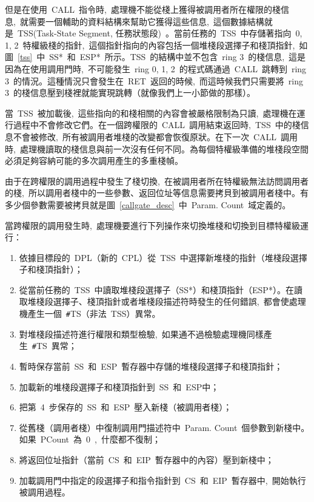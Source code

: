 
但是在使用~CALL~指令時,~處理機不能從棧上獲得被調用者所在權限的棧信息,~就需要一個輔助的資料結構來幫助它獲得這些信息,~這個數據結構就是~TSS(Task-State Segment, 任務狀態段)~。當前任務的~TSS~中存儲著指向~0, 1, 2~特權級棧的指針,~這個指針指向的內容包括一個堆棧段選擇子和棧頂指針,~如圖~\ref{tss}~中~SS*~和~ESP*~所示。TSS~的結構中並不包含~ring 3~的棧信息,~這是因為在使用調用門時,~不可能發生~ring 0, 1, 2~的程式碼通過~CALL~跳轉到~ring 3~的情況。這種情況只會發生在~RET~返回的時候,~而這時候我們只需要將~ring 3~的棧信息壓到棧裡就能實現跳轉（就像我們上一小節做的那樣）。

當~TSS~被加載後,~這些指向的和棧相關的內容會被嚴格限制為只讀,~處理機在運行過程中不會修改它們。在一個跨權限的~CALL~調用結束返回時,~TSS~中的棧信息不會被修改,~所有被調用者堆棧的改變都會恢復原狀。在下一次~CALL~調用時,~處理機讀取的棧信息與前一次沒有任何不同。為每個特權級準備的堆棧段空間必須足夠容納可能的多次調用產生的多重棧幀。

由于在跨權限的調用過程中發生了棧切換,~在被調用者所在特權級無法訪問調用者的棧,~所以調用者棧中的一些參數、返回位址等信息需要拷貝到被調用者棧中。有多少個參數需要被拷貝就是圖~\ref{callgate_desc}~中~Param. Count~域定義的。

當跨權限的調用發生時,~處理機要進行下列操作來切換堆棧和切換到目標特權級運行：

\begin{enumerate}
\item 依據目標段的~DPL（新的~CPL）從~TSS~中選擇新堆棧的指針（堆棧段選擇子和棧頂指針）；
\item 從當前任務的~TSS~中讀取堆棧段選擇子（SS*）和棧頂指針（ESP*）。在讀取堆棧段選擇子、棧頂指針或者堆棧段描述符時發生的任何錯誤,~都會使處理機產生一個~\texttt{\#}TS（非法~TSS）異常。
\item 對堆棧段描述符進行權限和類型檢驗,~如果通不過檢驗處理機同樣產生~\texttt{\#}TS~異常；
\item 暫時保存當前~SS~和~ESP~暫存器中存儲的堆棧段選擇子和棧頂指針；
\item 加載新的堆棧段選擇子和棧頂指針到~SS~和~ESP中；
\item 把第~4~步保存的~SS~和~ESP~壓入新棧（被調用者棧）；
\item 從舊棧（調用者棧）中復制調用門描述符中~Param. Count~個參數到新棧中。如果~PCount~為~0~,~什麼都不復制；
\item 將返回位址指針（當前~CS~和~EIP~暫存器中的內容）壓到新棧中；
\item 加載調用門中指定的段選擇子和指令指針到~CS~和~EIP~暫存器中,~開始執行被調用過程。
\end{enumerate}

